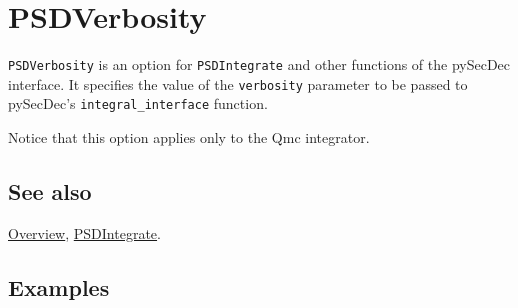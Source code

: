\documentclass[../FeynHelpersManual.tex]{subfiles}
\begin{document}
\hypertarget{psdverbosity}{
\section{PSDVerbosity}\label{psdverbosity}}

\texttt{PSDVerbosity} is an option for \texttt{PSDIntegrate} and other
functions of the pySecDec interface. It specifies the value of the
\texttt{verbosity} parameter to be passed to pySecDec's
\texttt{integral_interface} function.

Notice that this option applies only to the Qmc integrator.

\subsection{See also}

\hyperlink{toc}{Overview}, \hyperlink{psdintegrate}{PSDIntegrate}.

\subsection{Examples}
\end{document}
